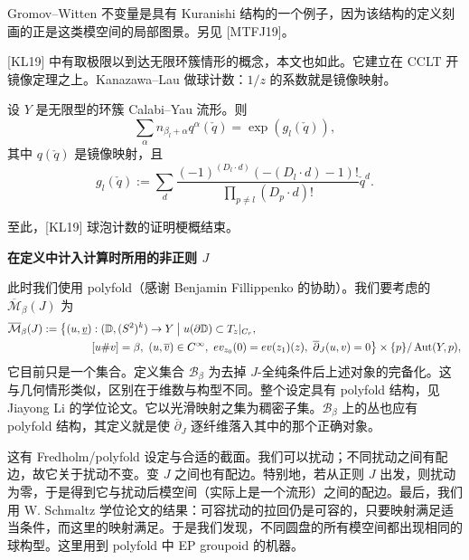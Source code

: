 
Gromov--Witten 不变量是具有 Kuranishi 结构的一个例子，因为该结构的定义刻画的正是这类模空间的局部图景。另见 [MTFJ19]。

[KL19] 中有取极限以到达无限环簇情形的概念，本文也如此。它建立在 CCLT 开镜像定理之上。Kanazawa--Lau 做球计数：$1/z$ 的系数就是镜像映射。

\begin{theorem}[{[KL19, Theorem 3.10]} 中的开镜像定理]\label{thm:open-mirror}
设 $Y$ 是无限型的环簇 Calabi--Yau 流形。则
\[
\sum_{\alpha}n_{\beta_l+\alpha}q^{\alpha}(\check q)=\exp(g_l(\check q)),
\]
其中 $q(\check q)$ 是镜像映射，且
\[
g_l(\check q):=\sum_d\frac{(-1)^{(D_l\cdot d)}(-(D_l\cdot d)-1)!}{\prod_{p\ne l}(D_p\cdot d)!}\check q^d.
\]
\end{theorem}

至此，[KL19] 球泡计数的证明梗概结束。

\medskip\noindent\textbf{在定义中计入计算时所用的非正则 $J$}\par
此时我们使用 polyfold（感谢 Benjamin Fillippenko 的协助）。我们要考虑的 $\overline{\mathcal{M}}_\beta(J)$ 为
\begin{align*}
\overline{\mathcal{M}}_\beta(J):=\bigl\{(u,\underline{v})&:(\mathbb{D},(S^2)^k)\to Y \bigm| u(\partial\mathbb{D})\subset T_z|_{C_r},\\
&[u\#v]=\beta,\ (u,\overline{v})\in C^\infty,\ ev_{z_0}(0)=ev(z_1)(z),\ \overline{\partial}_J(u,v)=0\bigr\}\times\{p\}/\operatorname{Aut}(Y,p),
\end{align*}
它目前只是一个集合。定义集合 $\mathcal{B}_\beta$ 为去掉 $J$-全纯条件后上述对象的完备化。这与几何情形类似，区别在于维数与构型不同。整个设定具有 polyfold 结构，见 Jiayong Li 的学位论文。它以光滑映射之集为稠密子集。$\mathcal{B}_\beta$ 上的丛也应有 polyfold 结构，其定义就是使 $\overline{\partial}_J$ 逐纤维落入其中的那个正确对象。

这有 Fredholm/polyfold 设定与合适的截面。我们可以扰动；不同扰动之间有配边，故它关于扰动不变。变 $J$ 之间也有配边。特别地，若从正则 $J$ 出发，则扰动为零，于是得到它与扰动后模空间（实际上是一个流形）之间的配边。最后，我们用 W. Schmaltz 学位论文的结果：可容扰动的拉回仍是可容的，只要映射满足适当条件，而这里的映射满足。于是我们发现，不同圆盘的所有模空间都出现相同的球构型。这里用到 polyfold 中 EP groupoid 的机器。

